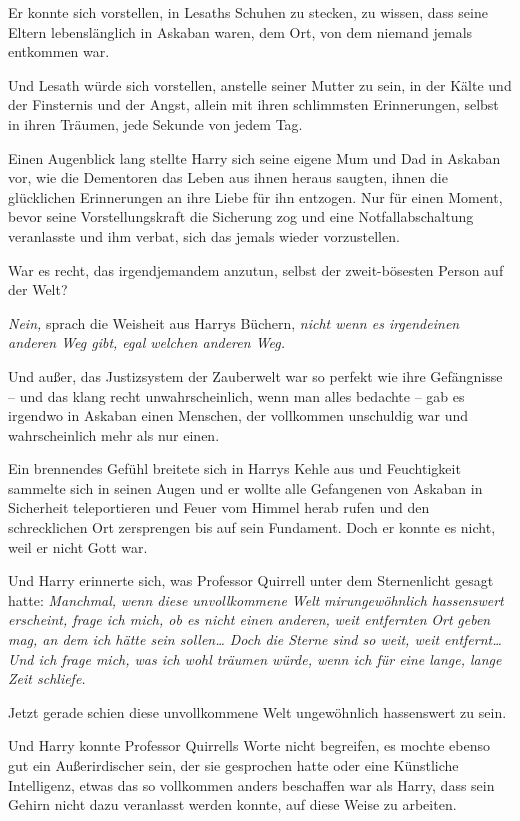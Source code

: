 {Er konnte sich vorstellen, in Lesaths Schuhen zu stecken, zu wissen, dass seine Eltern lebenslänglich in Askaban waren, dem Ort, von dem niemand jemals entkommen war.

Und Lesath würde sich vorstellen, anstelle seiner Mutter zu sein, in der Kälte und der Finsternis und der Angst, allein mit ihren schlimmsten Erinnerungen, selbst in ihren Träumen, jede Sekunde von jedem Tag.

Einen Augenblick lang stellte Harry sich seine eigene Mum und Dad in Askaban vor, wie die Dementoren das Leben aus ihnen heraus saugten, ihnen die glücklichen Erinnerungen an ihre Liebe für ihn entzogen. Nur für einen Moment, bevor seine Vorstellungskraft die Sicherung zog und eine Notfallabschaltung veranlasste und ihm verbat, sich das jemals wieder vorzustellen.

War es recht, das irgendjemandem anzutun, selbst der zweit-bösesten Person auf der Welt?

\emph{Nein,} sprach die Weisheit aus Harrys Büchern, \emph{nicht wenn es irgendeinen anderen Weg gibt, egal welchen anderen Weg.}

Und außer, das Justizsystem der Zauberwelt war so perfekt wie ihre Gefängnisse -- und das klang recht unwahrscheinlich, wenn man alles bedachte -- gab es irgendwo in Askaban einen Menschen, der vollkommen unschuldig war und wahrscheinlich mehr als nur einen.

Ein brennendes Gefühl breitete sich in Harrys Kehle aus und Feuchtigkeit sammelte sich in seinen Augen und er wollte alle Gefangenen von Askaban in Sicherheit teleportieren und Feuer vom Himmel herab rufen und den schrecklichen Ort zersprengen bis auf sein Fundament. Doch er konnte es nicht, weil er nicht Gott war.

Und Harry erinnerte sich, was Professor Quirrell unter dem Sternenlicht gesagt hatte: \emph{Manchmal,} \emph{wenn diese unvollkommene Welt} \emph{mirungewöhnlich} \emph{hassenswert erscheint, frage ich mich, ob es nicht einen anderen,} \emph{weit entfernten} \emph{Ort} \emph{geben mag, an dem ich hätte sein sollen… Doch die Sterne sind so weit, weit entfernt… Und ich frage mich, was ich wohl träumen würde, wenn ich für eine lange, lange Zeit schliefe.}

Jetzt gerade schien diese unvollkommene Welt ungewöhnlich hassenswert zu sein.

Und Harry konnte Professor Quirrells Worte nicht begreifen, es mochte ebenso gut ein Außerirdischer sein, der sie gesprochen hatte oder eine Künstliche Intelligenz, etwas das so vollkommen anders beschaffen war als Harry, dass sein Gehirn nicht dazu veranlasst werden konnte, auf diese Weise zu arbeiten.

}
